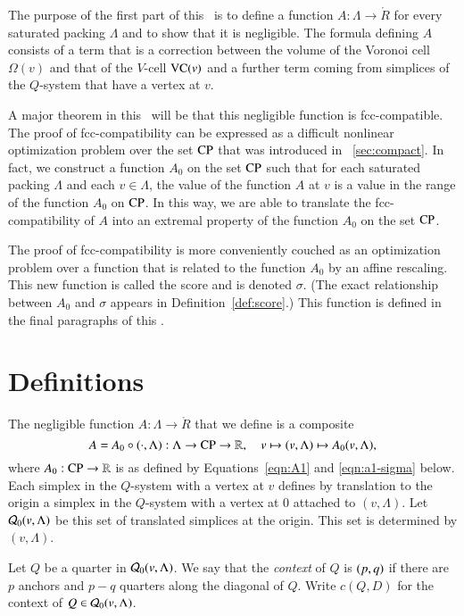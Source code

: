 The purpose of the first part of this \chap\ is to define a
function $A:\Lambda\to\ring{R}$ for every saturated packing
$\Lambda$ and to show that it is negligible.  The formula defining
$A$ consists of a term that is a correction between the volume of
the Voronoi cell $\Omega(v)$ and that of the $V$-cell ${\operatorname{VC}}(v)$
and a further term coming from simplices of the $Q$-system that
have a vertex at $v$.

A major theorem in this \paper\ will be that this negligible
function is fcc-compatible.  The proof of fcc-compatibility can be
expressed as a difficult nonlinear optimization problem over the
set ${\operatorname{CP}}$ that was introduced in \Chap~\ref{sec:compact}.  In
fact, we construct a  function $A_0$ on the set ${\operatorname{CP}}$ such
that for each saturated packing $\Lambda$ and each $v\in\Lambda$,
the value of the function $A$ at $v$ is a value in the range of
the function $A_0$ on ${\operatorname{CP}}$. In this way, we are able to
translate the fcc-compatibility of $A$ into an extremal property
of the function $A_0$ on the set ${\operatorname{CP}}$.

The proof of fcc-compatibility is more conveniently couched as an
optimization problem over a function that is related to the
function $A_0$ by an affine rescaling.   This new function is
called the score and is denoted $\sigma$.  (The exact relationship
between $A_0$ and $\sigma$ appears in Definition~\ref{def:score}.)
This function is defined in the final paragraphs of this \chap.


\section{Definitions}
\label{sec:rules}


The
negligible function $A:\Lambda\to\ring{R}$ that we define is a
composite
  \begin{equation}
  A = A_0\circ (\cdot,\Lambda)
  :\Lambda\to {\operatorname{CP}}\to \mathbb{R},\quad v\mapsto (v,\Lambda)\mapsto
  A_0(v,\Lambda),
  \label{eqn:A}
  \end{equation}
where $A_0:{\operatorname{CP}}\to\mathbb{R}$ is as defined by
Equations~\ref{eqn:A1} and \ref{eqn:a1-sigma} below.  Each simplex
in the $Q$-system with a vertex at $v$ defines by translation to
the origin a simplex in the $Q$-system with a vertex at $0$
attached to $(v,\Lambda)$. Let ${\mathcal Q}_0(v,\Lambda)$ be this set of
translated simplices at the origin. This set is determined by $(v,\Lambda)$.

\begin{definition} \label{def:context}
Let $Q$ be a quarter in ${\mathcal Q}_0(v,\Lambda)$.  We say that the {\it
context\/} of $Q$ is $\relax(p,q)$ if there are $p$ anchors and $p-q$
quarters along the diagonal of $Q$. Write $c(Q,D)$ for the context
of $Q\in{\mathcal Q}_0(v,\Lambda)$.
\end{definition}

